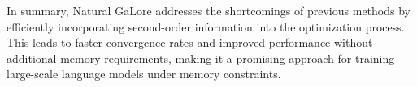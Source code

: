  In summary, Natural GaLore addresses the shortcomings of previous methods by efficiently incorporating second-order information into the optimization process. This leads to faster convergence rates and improved performance without additional memory requirements, making it a promising approach for training large-scale language models under memory constraints.





